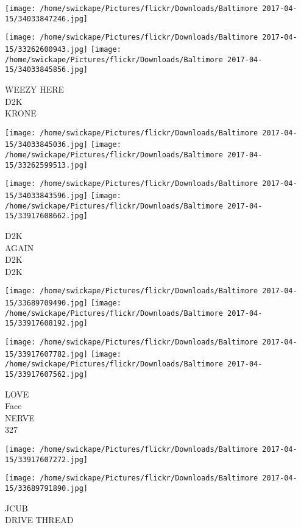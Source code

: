 \documentclass[10pt,letterpaper]{article}
\begin{document}
\texttt{[image: /home/swickape/Pictures/flickr/Downloads/Baltimore 2017-04-15/34033847246.jpg]}

\vspace{0.25in}
\texttt{[image: /home/swickape/Pictures/flickr/Downloads/Baltimore 2017-04-15/33262600943.jpg]}
\texttt{[image: /home/swickape/Pictures/flickr/Downloads/Baltimore 2017-04-15/34033845856.jpg]}

WEEZY HERE\\
D2K\\
KRONE\\
\pagebreak

\texttt{[image: /home/swickape/Pictures/flickr/Downloads/Baltimore 2017-04-15/34033845036.jpg]}
\texttt{[image: /home/swickape/Pictures/flickr/Downloads/Baltimore 2017-04-15/33262599513.jpg]}

\texttt{[image: /home/swickape/Pictures/flickr/Downloads/Baltimore 2017-04-15/34033843596.jpg]}
\texttt{[image: /home/swickape/Pictures/flickr/Downloads/Baltimore 2017-04-15/33917608662.jpg]}

D2K\\
AGAIN\\
D2K\\
D2K\\
\pagebreak

\texttt{[image: /home/swickape/Pictures/flickr/Downloads/Baltimore 2017-04-15/33689709490.jpg]}
\texttt{[image: /home/swickape/Pictures/flickr/Downloads/Baltimore 2017-04-15/33917608192.jpg]}

\texttt{[image: /home/swickape/Pictures/flickr/Downloads/Baltimore 2017-04-15/33917607782.jpg]}
\texttt{[image: /home/swickape/Pictures/flickr/Downloads/Baltimore 2017-04-15/33917607562.jpg]}

LOVE\\
Face\\
NERVE\\
327\\
\pagebreak

\texttt{[image: /home/swickape/Pictures/flickr/Downloads/Baltimore 2017-04-15/33917607272.jpg]}

\vspace{0.25in}
\texttt{[image: /home/swickape/Pictures/flickr/Downloads/Baltimore 2017-04-15/33689791890.jpg]}

JCUB\\
DRIVE THREAD\\
\pagebreak
\end{document}

